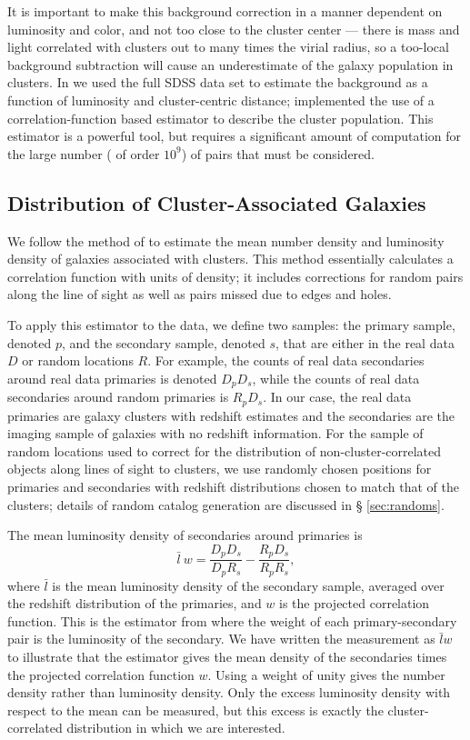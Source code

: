 \documentclass{emulateapj}
\begin{document}
It is important to make this background correction in a manner
dependent on luminosity and color, and not too close to the cluster
center --- there is mass and light correlated with clusters out to
many times the virial radius, so a too-local background subtraction
will cause an underestimate of the galaxy population in clusters. In
\citet{Hansen05} we used the full SDSS data set to estimate the
background as a function of luminosity and cluster-centric distance; \citet{Masjedi06a} implemented the use of a
correlation-function based estimator to describe the cluster
population. This estimator is a powerful tool, but requires a
significant amount of computation for the large number (
  of order $10^9$) of pairs that must be considered.



\subsection{Distribution of Cluster-Associated Galaxies} \label{sec:estimator}
We follow the method of \citet{Masjedi06a} to estimate the mean number density
and luminosity density of galaxies associated with clusters.  This method essentially
calculates a correlation function with units of density; it includes corrections for random
pairs along the line of sight as well as pairs missed due to edges and holes.

To apply this estimator to the data, we define two samples: the
primary sample, denoted $p$, and the secondary sample, denoted $s$,
that are either in the real data $D$ or random locations $R$.  For
example, the counts of real data secondaries around real data
primaries is denoted $D_p D_s$, while the counts of real data
secondaries around random primaries is $R_p D_s$.  In our case, the
real data primaries are galaxy clusters with redshift estimates and
the secondaries are the imaging sample of galaxies with no redshift
information. For the sample of random locations used to correct for
the distribution of non-cluster-correlated objects along lines of
sight to clusters, we use randomly chosen positions for primaries and
secondaries with redshift distributions chosen to match that of the
clusters; details of random catalog generation are discussed in \S
\ref{sec:randoms}.


The mean luminosity density of secondaries around primaries is 
\begin{equation} \label{eq:estimator}
\bar{l}~ w = \frac{D_p D_s}{D_p R_s} - \frac{R_p D_s}{R_p R_s},
\end{equation}
where $\bar{l}$ is the mean luminosity density of the secondary sample,
averaged over the redshift distribution of the primaries, and $w$ is the
projected correlation function. This is the estimator from \citet{Masjedi06a}
where the weight of each primary-secondary pair is the luminosity of the
secondary.  We have written the measurement as $\bar{l} w$ to illustrate that
the estimator gives the mean density of the secondaries times the projected
correlation function $w$. Using a weight of unity gives the number density rather than luminosity density. Only the excess luminosity density with respect to
the mean can be measured, but this excess is exactly the cluster-correlated distribution in which we are interested.
\end{document}
